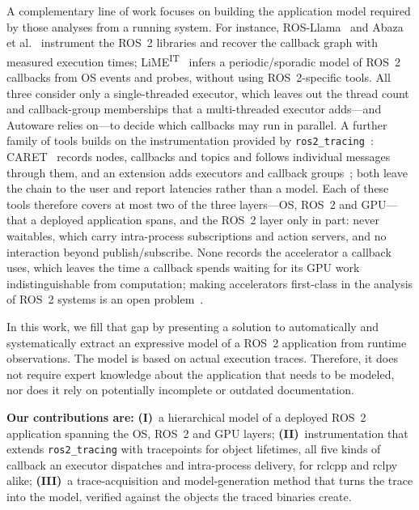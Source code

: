 A complementary line of work focuses on building the application model required by those analyses from a running system. For instance, ROS-Llama~\cite{blass-2021-rosllama-paper} and Abaza et al.~\cite{abaza-2024-ros2modelsynthesis} instrument the ROS~2 libraries and recover the callback graph with measured execution times; LiME\textsuperscript{IT}~\cite{brandenburg-2026-limeit} infers a periodic/sporadic model of ROS~2 callbacks from OS events and probes, without using ROS~2-specific tools. All three consider only a single-threaded executor, which leaves out the thread count and callback-group memberships that a multi-threaded executor adds---and Autoware relies on---to decide which callbacks may run in parallel. A further family of tools builds on the instrumentation provided by \texttt{ros2\_tracing}~\cite{bedard-2022-ros2tracing}: CARET~\cite{kuboichi-2022-caret} records nodes, callbacks and topics and follows individual messages through them, and an extension adds executors and callback groups~\cite{peng-2022-caretcomp}; both leave the chain to the user and report latencies rather than a model. Each of these tools therefore covers at most two of the three layers---OS, ROS~2 and GPU---that a deployed application spans, and the ROS~2 layer only in part: never waitables, which carry intra-process subscriptions and action servers, and no interaction beyond publish/subscribe. None records the accelerator a callback uses, which leaves the time a callback spends waiting for its GPU work indistinguishable from computation; making accelerators first-class in the analysis of ROS~2 systems is an open problem~\cite{yano-2026-rightanalyticalmodelsoftware}.

In this work, we fill that gap by presenting a solution to automatically and systematically extract an expressive model of a ROS~2 application from runtime observations. The model is based on actual execution traces. Therefore, it does not require expert knowledge about the application that needs to be modeled, nor does it rely on potentially incomplete or outdated documentation.

\textbf{Our contributions are:} \textbf{(I)}~a hierarchical model of a deployed ROS~2 application spanning the OS, ROS~2 and GPU layers; \textbf{(II)}~instrumentation that extends \texttt{ros2\_tracing} with tracepoints for object lifetimes, all five kinds of callback an executor dispatches and intra-process delivery, for rclcpp and rclpy alike; \textbf{(III)}~a trace-acquisition and model-generation method that turns the trace into the model, verified against the objects the traced binaries create.
